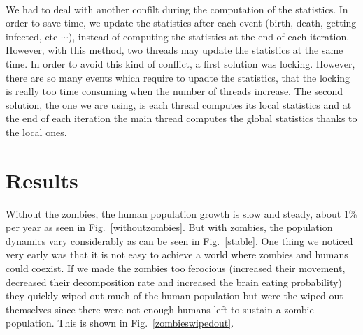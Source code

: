 \documentclass{report}
\begin{document}
\paragraph{}
We had to deal with another confilt during the computation of the statistics. In order to save time, we update the statistics after each event (birth, death, getting infected, etc $\cdots$), instead of computing the statistics at the end of each iteration. However, with this method, two threads may update the statistics at the same time. In order to avoid this kind of conflict, a first solution was locking. However, there are so many events which require to upadte the statistics, that the locking is really too time consuming when the number of threads increase. The second solution, the one we are using, is each thread computes its local statistics and at the end of each iteration the main thread computes the global statistics thanks to the local ones.



\section{Results}


Without the zombies, the human population growth is slow and steady, about 1\% per year as seen in Fig.~\ref{withoutzombies}. But with zombies, the population dynamics vary considerably as can be seen in Fig.~\ref{stable}. One thing we noticed very early was that it is not easy to achieve a world where zombies and humans could coexist. If we made the zombies too ferocious (increased their movement, decreased their decomposition rate and increased the brain eating probability) they quickly wiped out much of the human population but were the wiped out themselves since there were not enough humans left to sustain a zombie population. This is shown in Fig.~\ref{zombieswipedout}.
\end{document}
